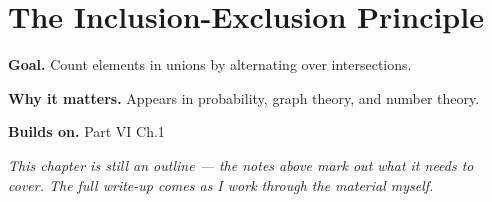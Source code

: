 \chapter{The Inclusion-Exclusion Principle}
\label{ch:06-combinatorics-and-graph-theory-04}

\begin{chapterintro}
\textbf{Goal.} Count elements in unions by alternating over intersections.

\textbf{Why it matters.} Appears in probability, graph theory, and number theory.

\textbf{Builds on.} Part VI Ch.1
\end{chapterintro}

\textit{This chapter is still an outline --- the notes above mark out what it needs to cover. The full write-up comes as I work through the material myself.}
